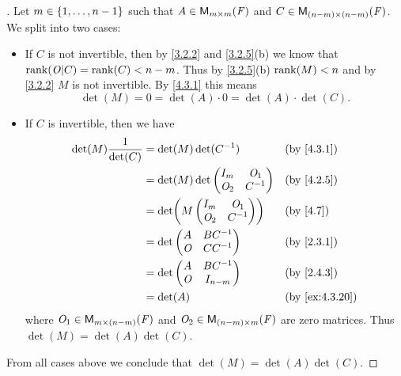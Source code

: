 \begin{proof}[]
	Let \(m \in \left\lbrace1, \dots, n - 1\right\rbrace\) such that \(A \in \ms[m][m][\F]\) and \(C \in \ms[(n - m)][(n - m)][\F]\).
	We split into two cases:
	\begin{itemize}
		\item If \(C\) is not invertible, then by \cref{3.2.2} and \cref{3.2.5}(b) we know that \(\rk{\zm | C} = \rk{C} < n - m\).
		      Thus by \cref{3.2.5}(b) \(\rk{M} < n\) and by \cref{3.2.2} \(M\) is not invertible.
		      By \cref{4.3.1} this means
		      \[
			      \det(M) = 0 = \det(A) \cdot 0 = \det(A) \cdot \det(C).
		      \]
		\item If \(C\) is invertible, then we have
		      \begin{align*}
			      \det(M) \frac{1}{\det(C)} & = \det(M) \det(C^{-1})        &  & \by{4.3.1}     \\
			                                & = \det(M) \det\begin{pmatrix}
				                                                I_m   & \zm_1  \\
				                                                \zm_2 & C^{-1}
			                                                \end{pmatrix} &  & \by{4.2.5}       \\
			                                & = \det\pa{M \begin{pmatrix}
					                                              I_m   & \zm_1  \\
					                                              \zm_2 & C^{-1}
				                                              \end{pmatrix}}   &  & \by{4.7}        \\
			                                & = \det\begin{pmatrix}
				                                        A   & BC^{-1} \\
				                                        \zm & CC^{-1}
			                                        \end{pmatrix}         &  & \by{2.3.1}       \\
			                                & = \det\begin{pmatrix}
				                                        A   & BC^{-1}   \\
				                                        \zm & I_{n - m}
			                                        \end{pmatrix}         &  & \by{2.4.3}       \\
			                                & = \det(A)                     &  & \by{ex:4.3.20}
		      \end{align*}
		      where \(\zm_1 \in \ms[m][(n - m)][\F]\) and \(\zm_2 \in \ms[(n - m)][m][\F]\) are zero matrices.
		      Thus \(\det(M) = \det(A) \det(C)\).
	\end{itemize}
	From all cases above we conclude that \(\det(M) = \det(A) \det(C)\).
\end{proof}

